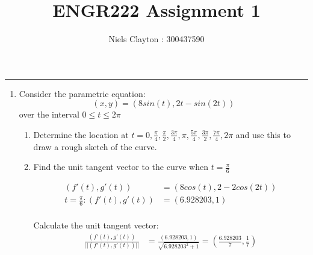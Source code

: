 \documentclass[a4paper,11pt]{article}
\begin{document}
\title{\LARGE{\textbf{ENGR222 Assignment 1}}}
\author{Niels Clayton : 300437590}
\date{}
\maketitle
\hrule

\begin{enumerate}
    \item Consider the parametric equation: $$ (x,y) = (8sin(t), 2t-sin(2t)) $$ over the interval $ 0 \leq t \leq 2\pi $

    \begin{enumerate}
        \item Determine the location at $ t=0 , \frac{\pi}{4}, \frac{\pi}{2}, \frac{3\pi}{4}, \pi, \frac{5\pi}{4}, \frac{3\pi}{2}, \frac{7\pi}{4}, 2\pi$ and use this to draw a rough sketch of the curve.
        
        \begin{center}
        \end{center}

        \item Find the unit tangent vector to the curve when $t = \frac{\pi}{6} $

        \begin{align*}
            \left(f'(t), g'(t)\right) &= \left( 8 cos(t), 2 - 2 cos(2t)\right)\\
            t = \frac{\pi}{6} : \left(f'(t), g'(t)\right) &= (6.928203, 1)\\
        \end{align*}

        Calculate the unit tangent vector:
        \begin{align*}
            \frac{(f'(t), g'(t))}{||(f'(t), g'(t))||} &= \frac{(6.928203, 1)}{\sqrt{6.928203^2 + 1}} = \left( \frac{6.928203}{7}, \frac{1}{7}\right)\\
        \end{align*}


\end{enumerate}
\end{enumerate}
\end{document}
